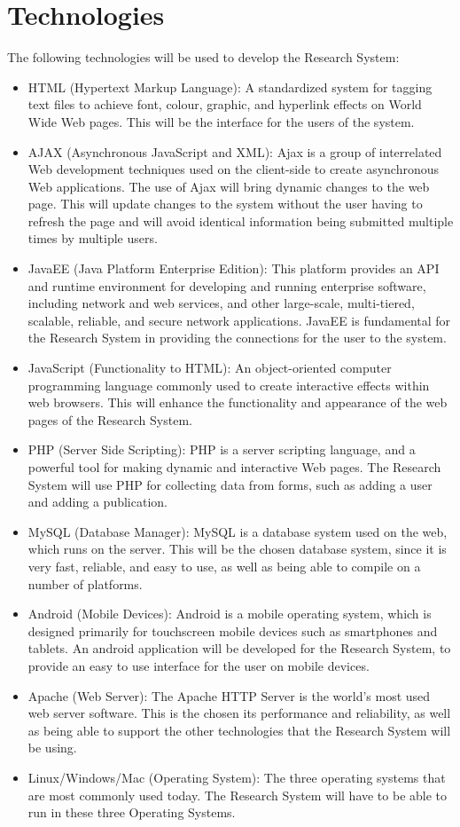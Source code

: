 \documentclass[a4paper]{article}
\begin{document}
	
	
	\section{Technologies}
	The following technologies will be used to develop the Research System:
	\begin{itemize}
		\item HTML (Hypertext Markup Language): A standardized system for tagging text files to achieve font, colour, graphic, and hyperlink effects on World Wide Web pages. This will be the interface for the users of the system. 
		\item AJAX (Asynchronous JavaScript and XML): Ajax is a group of interrelated Web development techniques used on the client-side to create asynchronous Web applications. The use of Ajax will bring dynamic changes to the web page. This will update changes to the system without the user having to refresh the page and will avoid identical information being submitted multiple times by multiple users. 
		\item JavaEE (Java Platform Enterprise Edition): This platform provides an API and runtime environment for developing and running enterprise software, including network and web services, and other large-scale, multi-tiered, scalable, reliable, and secure network applications. JavaEE is fundamental for the Research System in providing the connections for the user to the system.
		\item JavaScript (Functionality to HTML): An object-oriented computer programming language commonly used to create interactive effects within web browsers. This will enhance the functionality and appearance of the web pages of the Research System.
		\item PHP (Server Side Scripting): PHP is a server scripting language, and a powerful tool for making dynamic and interactive Web pages. The Research System will use PHP for collecting data from forms, such as adding a user and adding a publication. 
		\item MySQL (Database Manager): MySQL is a database system used on the web, which runs on the server. This will be the chosen database system, since it is very fast, reliable, and easy to use, as well as being able to compile on a number of platforms.
		\item Android (Mobile Devices): Android is a mobile operating system, which is designed primarily for touchscreen mobile devices such as smartphones and tablets. An android application will be developed for the Research System, to provide an easy to use interface for the user on mobile devices.
		\item Apache (Web Server): The Apache HTTP Server is the world's most used web server software. This is the chosen its performance and reliability, as well as being able to support the other technologies that the Research System will be using. 
		\item Linux/Windows/Mac (Operating System): The three operating systems that are most commonly used today. The Research System will have to be able to run in these three Operating Systems.
		\\
		\\
	\end{itemize}
\end{document}
